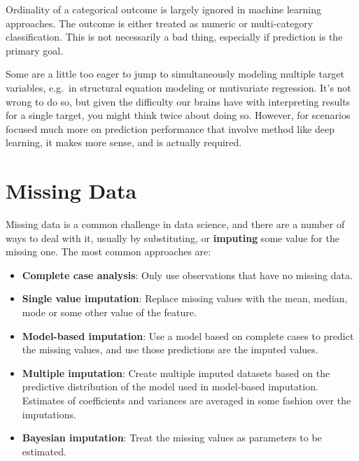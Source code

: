 \documentclass[
  letterpaper,
]{krantz}
\providecommand{\tightlist}{%
  \setlength{\itemsep}{0pt}\setlength{\parskip}{0pt}}\usepackage{longtable,booktabs,array}
\begin{document}
Ordinality of a categorical outcome is largely ignored in machine
learning approaches. The outcome is either treated as numeric or
multi-category classification. This is not necessarily a bad thing,
especially if prediction is the primary goal.

\begin{tcolorbox}[enhanced jigsaw, toprule=.15mm, arc=.35mm, rightrule=.15mm, bottomrule=.15mm, leftrule=.75mm, breakable, colframe=quarto-callout-tip-color-frame, colback=white, left=2mm, opacityback=0]
\begin{minipage}[t]{5.5mm}
\textcolor{quarto-callout-tip-color}{\faLightbulb}
\end{minipage}%
\begin{minipage}[t]{\textwidth - 5.5mm}

Some are a little too eager to jump to simultaneously modeling multiple
target variables, e.g.~in structural equation modeling or mutivariate
regression. It's not wrong to do so, but given the difficulty our brains
have with interpreting results for a single target, you might think
twice about doing so. However, for scenarios focused much more on
prediction performance that involve method like deep learning, it makes
more sense, and is actually required.

\end{minipage}%
\end{tcolorbox}

\section{Missing Data}\label{sec-missing-data}

Missing data is a common challenge in data science, and there are a
number of ways to deal with it, usually by substituting, or
\textbf{imputing} some value for the missing one. The most common
approaches are:

\begin{itemize}
\tightlist
\item
  \textbf{Complete case analysis}: Only use observations that have no
  missing data.
\item
  \textbf{Single value imputation}: Replace missing values with the
  mean, median, mode or some other value of the feature.
\item
  \textbf{Model-based imputation}: Use a model based on complete cases
  to predict the missing values, and use those predictions are the
  imputed values.
\item
  \textbf{Multiple imputation}: Create multiple imputed datasets based
  on the predictive distribution of the model used in model-based
  imputation. Estimates of coefficients and variances are averaged in
  some fashion over the imputations.
\item
  \textbf{Bayesian imputation}: Treat the missing values as parameters
  to be estimated.
\end{itemize}
\end{document}
